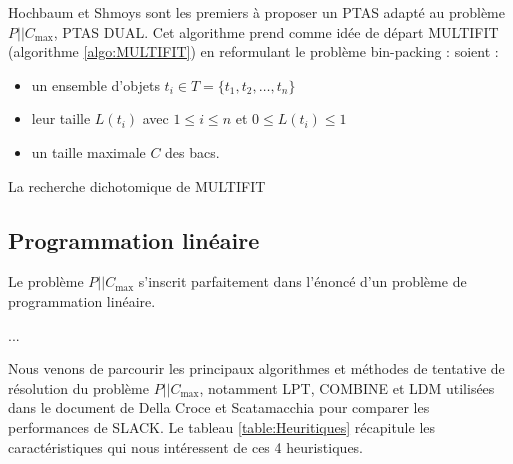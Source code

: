 \documentclass[a4paper,12pt]{report}
\theoremstyle{plain}				%
\theoremstyle{definition}				%
\newcommand\problemGrahamP{$P||C_{\max}$\xspace}
\begin{document}
Hochbaum et Shmoys sont les premiers à proposer un PTAS \cite{hochbaum1987using} 
  adapté au problème \problemGrahamP, PTAS DUAL. 
Cet algorithme prend comme idée de départ MULTIFIT (algorithme \ref{algo:MULTIFIT}) 
  en reformulant le problème bin-packing :
  soient :
\begin{itemize}
	\item un ensemble d'objets $t_i \in T=\{t_1, t_2, \ldots, t_n\}$
	\item leur taille $L(t_i)$ avec $1 \leq i \leq n$ et $0 \leq L(t_i) \leq 1$
	\item un taille maximale $C$ des bacs.
\end{itemize}    
La recherche dichotomique de MULTIFIT



\subsection{Programmation linéaire}\label{ssec:programmationLineaire}

Le problème \problemGrahamP s'inscrit parfaitement dans l'énoncé d'un problème de programmation linéaire.

...

\bigskip
Nous venons de parcourir les principaux algorithmes et méthodes de tentative de résolution du problème \problemGrahamP, 
  notamment LPT, COMBINE et LDM 
  utilisées dans le document de Della Croce et Scatamacchia \cite{della2020longest} 
  pour comparer les performances de SLACK. 
Le tableau \ref{table:Heuritiques} récapitule les caractéristiques qui nous intéressent 
  de ces 4 heuristiques.
\end{document}
